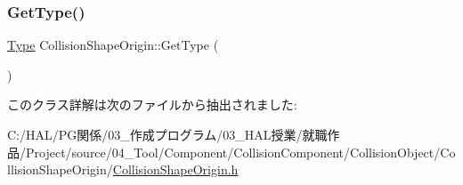 \subsubsection{\texorpdfstring{Get\+Type()}{GetType()}}
{\footnotesize\ttfamily \mbox{\hyperlink{class_collision_shape_origin_a67e36d4922d9723caed9c21b1df80f0b}{Type}} Collision\+Shape\+Origin\+::\+Get\+Type (\begin{DoxyParamCaption}{ }\end{DoxyParamCaption})\hspace{0.3cm}{\ttfamily [inline]}}



このクラス詳解は次のファイルから抽出されました\+:\begin{DoxyCompactItemize}
\item 
C\+:/\+H\+A\+L/\+P\+G関係/03\+\_\+作成プログラム/03\+\_\+\+H\+A\+L授業/就職作品/\+Project/source/04\+\_\+\+Tool/\+Component/\+Collision\+Component/\+Collision\+Object/\+Collision\+Shape\+Origin/\mbox{\hyperlink{_collision_shape_origin_8h}{Collision\+Shape\+Origin.\+h}}\end{DoxyCompactItemize}
